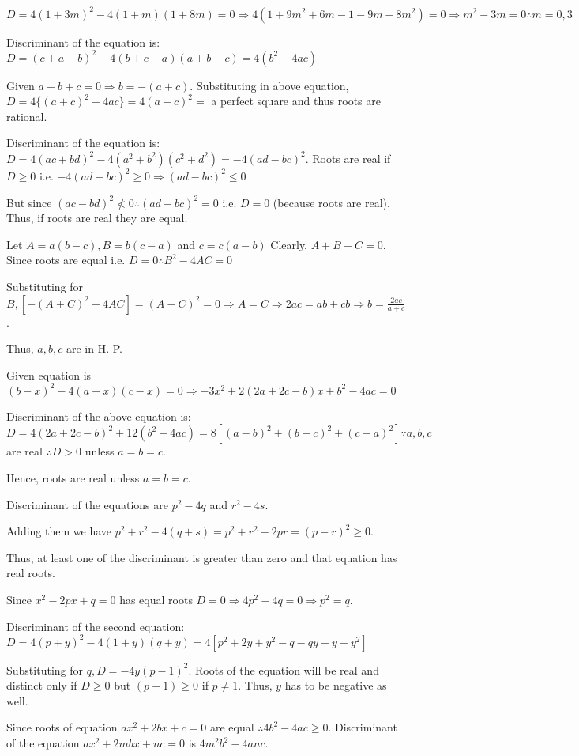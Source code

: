    $D = 4(1 + 3m)^2 - 4(1 + m)(1 + 8m) = 0\Rightarrow 4(1 + 9m^2 + 6m - 1 - 9m -8m^2) = 0\Rightarrow m^2 -
  3m = 0 \therefore m = 0, 3$
\item Discriminant of the equation is: $D = (c + a - b)^2 - 4(b + c - a)(a + b -c) = 4(b^2 - 4ac)$

  Given $a + b + c = 0 \Rightarrow b = -(a + c).$ Substituting in above equation, $D = 4\{(a + c)^2 - 4ac\}
  = 4(a - c)^2 =$ a perfect square and thus roots are rational.
\item Discriminant of the equation is: $D = 4(ac + bd)^2 - 4(a^2 + b^2)(c^2 + d^2) = -4(ad - bc)^2$. Roots
  are real if $D\geq 0$ i.e. $-4(ad - bc)^2 \geq 0 \Rightarrow (ad - bc)^2 \leq 0$

  But since $(ac - bd)^2 \nless 0 \therefore (ad - bc)^2 = 0$ i.e. $D = 0$ (because roots are real). Thus,
  if roots are real they are equal.
\item Let $A = a(b - c), B = b(c - a)$ and $c = c(a - b)$ Clearly, $A + B + C = 0$. Since roots are equal
  i.e. $D = 0 \therefore B^2 - 4AC = 0$

  Substituting for $B, [-(A + C)^2 - 4AC] = (A - C)^2 = 0 \Rightarrow A = C \Rightarrow 2ac = ab + cb
  \Rightarrow b = \frac{2ac}{a + c}$.

  Thus, $a, b, c$ are in H. P.
\item Given equation is $(b - x)^2 - 4(a - x)(c - x) = 0\Rightarrow -3x^2 + 2(2a + 2c - b)x + b^2 - 4ac = 0$

  Discriminant of the above equation is: $D = 4(2a + 2c - b)^2 + 12(b^2 - 4ac) = 8[(a - b)^2 + (b - c)^2 +
    (c - a)^2]\because a, b, c$ are real $\therefore D > 0$ unless $a = b = c$.

  Hence, roots are real unless $a = b = c$.
\item Discriminant of the equations are $p^2 - 4q$ and $r^2 - 4s$.

  Adding them we have $p^2 + r^2 - 4(q + s) = p^2 + r^2 - 2pr = (p - r)^2 \geq 0$.

  Thus, at least one of the discriminant is greater than zero and that equation has real roots.
\item Since $x^2 - 2px + q = 0$ has equal roots $D = 0 \Rightarrow 4p^2 - 4q = 0 \Rightarrow p^2 = q$.

  Discriminant of the second equation: $D = 4(p + y)^2 - 4(1 + y)(q + y) = 4[p^2 + 2y + y^2 - q -qy -y - y^2]$

  Substituting for $q, D = -4y(p - 1)^2$. Roots of the equation will be real and distinct only if $D \geq
  0$ but $(p - 1) \geq 0$ if $p \neq 1$. Thus, $y$ has to be negative as well.
\item Since roots of equation $ax^2 + 2bx + c = 0$ are equal $\therefore 4b^2 - 4ac \geq 0$. Discriminant of
  the equation $ax^2 + 2mbx + nc = 0$ is $4m^2b^2 - 4anc$.

